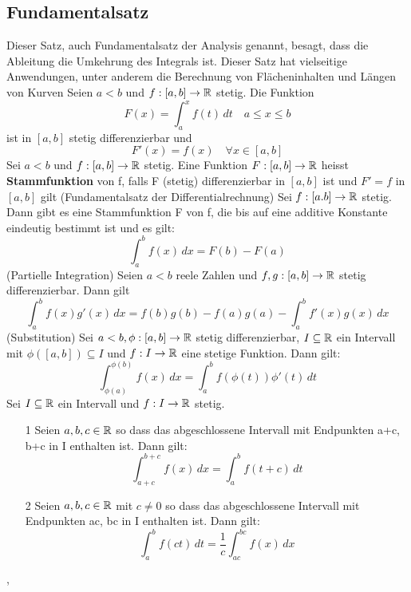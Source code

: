 \subsection{Fundamentalsatz}
Dieser Satz, auch Fundamentalsatz der Analysis genannt, besagt, dass die Ableitung die Umkehrung des Integrals ist. Dieser Satz hat vielseitige Anwendungen, unter anderem die Berechnung von Flächeninhalten und Längen von Kurven \newline
\Satz[5.26] Seien \(a < b\) und \(f: [a,b] \rightarrow \mathbb{R} \) stetig. Die Funktion
\[F(x) = \int_{a}^{x} f(t) \,dt \quad a \leq x \leq b\]
ist in \([a,b]\) stetig differenzierbar und
\[ F'(x) = f(x) \quad \forall x \in [a,b]\]
\Def[5.27] Sei \( a < b\) und \(f: [a,b] \rightarrow \mathbb{R}\) stetig. Eine Funktion \(F: [a,b] \rightarrow \mathbb{R}\) heisst \textbf{Stammfunktion} von f, falls F (stetig) differenzierbar in \([a,b]\) ist und \(F'=f\) in \([a,b]\) gilt \newline
\Satz[5.28] (Fundamentalsatz der Differentialrechnung) Sei \(f:[a.b] \rightarrow \mathbb{R} \) stetig. Dann gibt es eine Stammfunktion F von f, die bis auf eine additive Konstante eindeutig bestimmt ist und es gilt: 
\[ \int_{a}^{b} f(x) \,dx = F(b) - F(a)\]
\Bsp[5.29]
(Partielle Integration) Seien \(a < b\) reele Zahlen und \(f,g : [a,b] \rightarrow \mathbb{R} \) stetig differenzierbar. Dann gilt
\[\int_{a}^{b} f(x)g'(x) \,dx = f(b)g(b) - f(a)g(a) - \int_{a}^{b} f'(x)g(x) \,dx\]
(Substitution) Sei \(a < b, \phi : [a,b] \rightarrow \mathbb{R} \) stetig differenzierbar, \( I \subseteq \mathbb{R}\) ein Intervall mit \( \phi ([a,b]) \subseteq I \) und \(f: I \rightarrow \mathbb{R} \) eine stetige Funktion. Dann gilt:
\[ \int_{\phi(a)}^{\phi(b)} f(x) \,dx = \int_{a}^{b} f(\phi(t))\phi'(t) \,dt\]
 Sei \( I \subseteq \mathbb{R} \) ein Intervall und \(f: I \rightarrow \mathbb{R}\) stetig.
\begin{enumerate}
    \item [1] Seien \(a,b,c \in \mathbb{R} \) so dass das abgeschlossene Intervall mit Endpunkten a+c, b+c in I enthalten ist. Dann gilt:
    \[ \int_{a+c}^{b+c} f(x) \,dx = \int_{a}^{b} f(t+c) \,dt\]
    \item [2] Seien \(a,b,c \in \mathbb{R} \) mit \( c \neq 0\) so dass das abgeschlossene Intervall mit Endpunkten ac, bc in I enthalten ist. Dann gilt:
    \[\int_{a}^{b} f(ct) \,dt = \frac{1}{c} \int_{ac}^{bc} f(x) \,dx \]
\end{enumerate}
\sep
